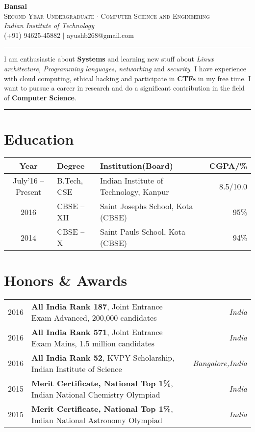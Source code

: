 \documentclass[11pt]{article}
\let\bold\textbf
\let\ital\textit
\let\smca\textsc
\begin{document}
\begin{center}
  {\fontsize{33}{60} \bold{Bansal}} \\
  {\scriptsize {\color{lightgrey}\smca{Second Year Undergraduate $\cdot$ Computer Science and Engineering}}} \\
  {\footnotesize \ital{\color{lightgrey}Indian Institute of Technology}} \\
  {\scriptsize (+91) 94625-45882 $\mid$ ayushb268@gmail.com}
\end{center}
\rule{\textwidth}{2pt}\vspace{0.2cm}
I am enthusiastic about \bold{Systems} and learning new stuff about \ital{Linux architecture, Programming languages, networking} and \ital{security}. I have experience with cloud computing, ethical hacking and participate in \bold{CTFs} in my free time. I want to pursue a career in research and do a significant contribution in the field of \bold{Computer Science}. \\
\rule{\textwidth}{2pt}
\section*{{\selectfont Edu}cation\color{gray}\hrulefill}

\begin{tabu} to \textwidth {| c | l | X[c] | r |}
  \hline
  \bold{Year} & \bold{Degree} & \bold{Institution(Board)} & \bold{CGPA/\%} \\
  \hline
  July'16 -- Present & B.Tech, CSE & Indian Institute of Technology, Kanpur & 8.5/10.0 \\
  2016 & CBSE -- XII & Saint Josephs School, Kota (CBSE) & 95\% \\
  2014 & CBSE -- X & Saint Pauls School, Kota (CBSE) & 94\%\\
  \hline
\end{tabu}

\section*{{\selectfont Hon}ors \& Awards\color{gray}\hrulefill}

\begin{tabu} to \textwidth {c X[l] r}
  2016 & \bold{All India Rank 187}, Joint Entrance Exam Advanced, 200,000 candidates & {\footnotesize{}\selectfont\ital{India}} \\
  2016 & \bold{All India Rank 571}, Joint Entrance Exam Mains, 1.5 million candidates & {\footnotesize{}\selectfont\ital{India}} \\
  2016 & \bold{All India Rank 52}, KVPY Scholarship, Indian Institute of Science & {\footnotesize{}\selectfont\ital{Bangalore,India}} \\
  2015 & \bold{Merit Certificate, National Top 1\%}, Indian National Chemistry Olympiad & {\footnotesize{}\selectfont\ital{India}} \\
  2015 & \bold{Merit Certificate, National Top 1\%}, Indian National Astronomy Olympiad & {\footnotesize{}\selectfont\ital{India}}
\end{tabu}
\end{document}
